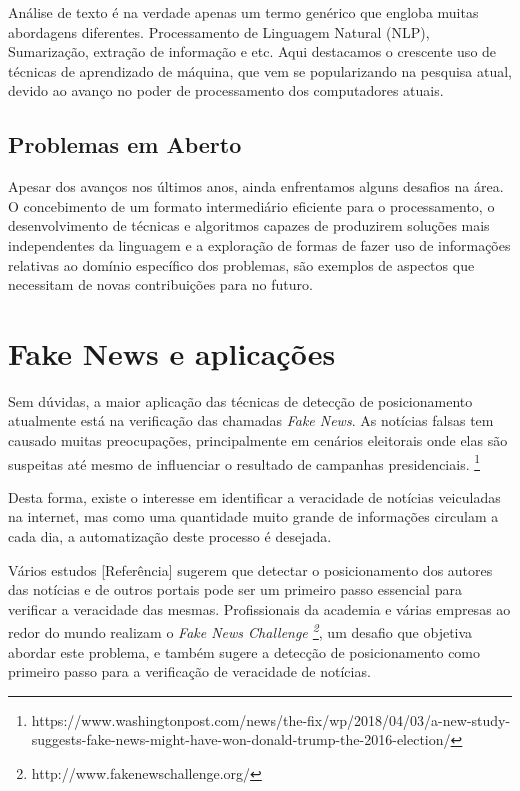 \quad Análise de texto é na verdade apenas um termo genérico que engloba muitas
abordagens diferentes. Processamento de Linguagem Natural (NLP), Sumarização,
extração de informação e etc. Aqui destacamos o crescente uso de técnicas de
aprendizado de máquina, que vem se popularizando na pesquisa atual, devido ao
avanço no poder de processamento dos computadores atuais.

\subsection{Problemas em Aberto}

\quad Apesar dos avanços nos últimos anos, ainda enfrentamos alguns desafios na área.
O concebimento de um formato intermediário eficiente para o processamento, o
desenvolvimento de técnicas e algoritmos capazes de produzirem soluções mais
independentes da linguagem e a exploração de formas de fazer uso de informações
relativas ao domínio específico dos problemas, são exemplos de aspectos que
necessitam de novas contribuições para no futuro.

\section{Fake News e aplicações}

\quad Sem dúvidas, a maior aplicação das técnicas de detecção de posicionamento
atualmente está na verificação das chamadas \textit{Fake News}. As notícias falsas
tem causado muitas preocupações, principalmente em cenários eleitorais onde elas
são suspeitas até mesmo de influenciar o resultado de campanhas presidenciais.
\footnote{https://www.washingtonpost.com/news/the-fix/wp/2018/04/03/a-new-study-suggests-fake-news-might-have-won-donald-trump-the-2016-election/}

\quad Desta forma, existe o interesse em identificar a veracidade de notícias
veiculadas na internet, mas como uma quantidade muito grande de informações circulam
a cada dia, a automatização deste processo é desejada.

\quad Vários estudos [Referência] sugerem que detectar o posicionamento dos autores
das notícias e de outros portais pode ser um primeiro passo essencial para verificar
a veracidade das mesmas. Profissionais da academia e várias empresas ao redor do
mundo realizam o \textit{Fake News Challenge
\footnote{http://www.fakenewschallenge.org/}}, um desafio que objetiva abordar este
problema, e também sugere a detecção de posicionamento como primeiro passo para a
verificação de veracidade de notícias.

